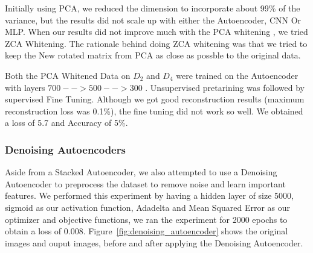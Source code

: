 Initially using PCA, we reduced the dimension to incorporate about 99\% of the variance, but the results did not scale up with either the Autoencoder, CNN Or MLP. When our results did not improve much with the PCA whitening , we tried ZCA Whitening. The rationale behind doing ZCA whitening was that we tried to keep the New rotated matrix from PCA as close as possble to the original data.

Both the PCA Whitened Data on $D_{2}$ and $D_{4}$ were trained on the Autoencoder with layers $ 700-->500-->300 $ . Unsupervised pretarining was followed by supervised Fine Tuning. Although we got good reconstruction results (maximum reconstruction loss was 0.1\%), the fine tuning did not work so well. We obtained a loss of 5.7 and Accuracy of 5\%.


\newpage
\subsubsection{Denoising Autoencoders}
Aside from a Stacked Autoencoder, we also attempted to use a Denoising Autoencoder \cite{vincent2008extracting} to preprocess the dataset to remove noise and learn important features. We performed this experiment by having a hidden layer of size 5000, sigmoid as our activation function, Adadelta and Mean Squared Error as our optimizer and objective functions, we ran the experiment for 2000 epochs to obtain a loss of 0.008. Figure~\ref{fig:denoising_autoencoder} shows the original images and ouput images, before and after applying the Denoising Autoencoder.

